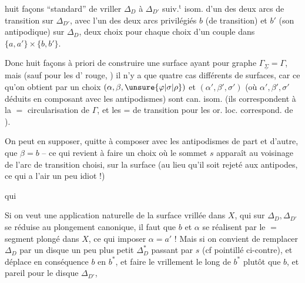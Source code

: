 huit façons ``standard'' de vriller $\Delta_D$ à $\Delta_{D'}$ suiv.$^{\mathrm t}$   isom.  d'un des deux arcs de transition  sur $\Delta_{D'}$, avec l'un des deux arcs privilégiés $b$ (de transition) et $b'$ (son antipodique) sur $\Delta_D$, deux choix pour chaque choix d'un couple dans $\{a,a'\}\times\{b,b'\}$.

Donc huit façons à priori de construire une surface  ayant pour graphe $\Gamma_{\underline\Sigma}=\Gamma$, mais (sauf pour les  d' rouge, ) il n'y a que quatre cas différents de surfaces, car ce qu'on obtient par un choix $(\alpha,\beta,\unsure{\varphi|\sigma|\rho})$ et $(\alpha',\beta',\sigma')$ (où $\alpha',\beta',\sigma'$ déduits en composant avec les antipodismes) sont can. isom. (ils correspondent à la \ensuremath{=} circularisation de $\Gamma$, et les $\mathord{=}$  de transition pour les or. loc. correspond. de ).

On peut en supposer, quitte à composer avec les antipodismes de part et d'autre, que $\beta=b$ -- ce qui revient à faire un choix où le sommet $s$ apparaît  au voisinage de l'arc de transition choisi, sur la surface  (au lieu qu'il soit rejeté aux antipodes, ce qui a l'air un peu idiot !)

 qui

Si on veut une application naturelle de la surface vrillée dans $X$, qui sur $\Delta_D,\Delta_{D'}$ se réduise au plongement canonique, il faut  que $b$ et $\alpha$ se réalisent par le $=$ segment plongé dans $X$, ce qui  imposer $\alpha=a'$ ! Mais si on convient de remplacer $\Delta_D$ par un disque un peu plus petit $\Delta_D^*$  passant par $s$ (cf pointillé ci-contre), et déplace en conséquence $b$ en $b^*$, et faire le vrillement le long de $b^*$ plutôt que $b$,  et pareil pour le disque $\Delta_{D'}$,

